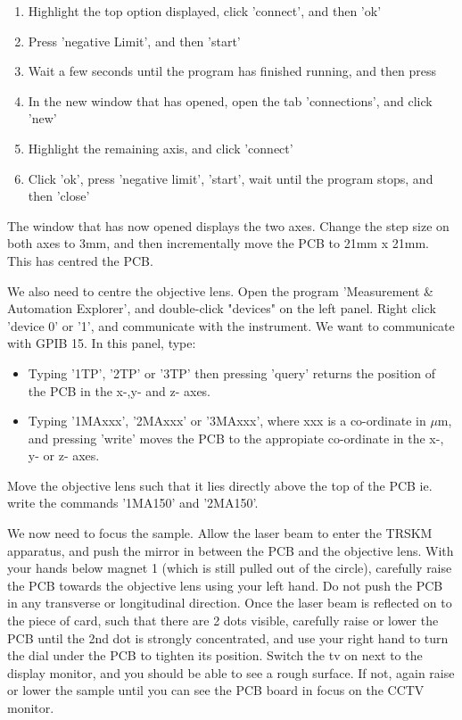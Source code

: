 \documentclass[14pt,a4paper] {article}
\begin{document}

\begin{enumerate}
\item Highlight the top option displayed, click 'connect', and then 'ok'
\item Press 'negative Limit', and then 'start'
\item Wait a few seconds until the program has finished running, and then press %
\item In the new window that has opened, open the tab 'connections', and click 'new'
\item Highlight the remaining axis, and click 'connect'
\item Click 'ok', press 'negative limit', 'start', wait until the program stops, and then 'close'
\end{enumerate}

The window that has now opened displays the two axes. Change the step size on both axes to 3mm, and then incrementally move the PCB to 21mm x 21mm. This has centred the PCB.

We also need to centre the objective lens. Open the program 'Measurement \& Automation Explorer', and double-click "devices" on the left panel. Right click 'device 0' or '1', and communicate with the instrument. We want to communicate with GPIB 15. In this panel, type:

\begin{itemize}
\item Typing '1TP', '2TP' or '3TP' then pressing 'query' returns the position of the PCB in the x-,y- and z- axes.
\item Typing '1MAxxx', '2MAxxx' or '3MAxxx', where xxx is a co-ordinate in $\mu$m, and pressing 'write' moves the PCB to the appropiate co-ordinate in the x-, y- or z- axes.
\end{itemize}

Move the objective lens such that it lies directly above the top of the PCB ie. write the commands '1MA150' and '2MA150'.

We now need to focus the sample. Allow the laser beam to enter the TRSKM apparatus, and push the mirror in between the PCB and the objective lens. With your hands below magnet 1 (which is still pulled out of the circle), carefully raise the PCB towards the objective lens using your left hand. Do not push the PCB in any transverse or longitudinal direction. Once the laser beam is reflected on to the piece of card, such that there are 2 dots visible, carefully raise or lower the PCB until the 2nd dot is strongly concentrated, and use your right hand to turn the dial under the PCB to tighten its position. Switch the tv on next to the display monitor, and you should be able to see a rough surface. If not, again raise or lower the sample until you can see the PCB board in focus on the CCTV monitor.
\end{document}
